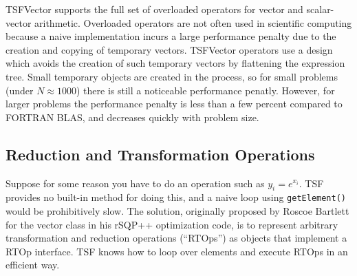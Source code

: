 TSFVector supports the full set of overloaded operators for vector and scalar-vector
arithmetic. Overloaded operators are not often used in scientific computing
because a naive implementation incurs a large performance penalty due to 
the creation and copying of temporary vectors. TSFVector operators use a design
which avoids the creation of such temporary vectors by flattening the expression
tree. Small temporary objects are created in the process, so for small problems
(under $N \approx 1000 $) there is still a noticeable performance penatly. 
However, for larger problems the performance penalty is less than a few percent
compared to FORTRAN BLAS, and decreases quickly with problem size. 

\subsection{Reduction and Transformation Operations}

Suppose for some reason you have to do an operation such as $y_i = e^{x_i}$. TSF
provides no built-in method for doing this, and a naive loop using {\tt getElement()}
would be prohibitively slow. The solution, originally proposed by Roscoe 
Bartlett for the vector class in his rSQP++ optimization code, is to 
represent arbitrary transformation and reduction operations (``RTOps'') 
as objects that implement a RTOp interface. TSF knows how to loop over 
elements and execute RTOps in an efficient way. 














